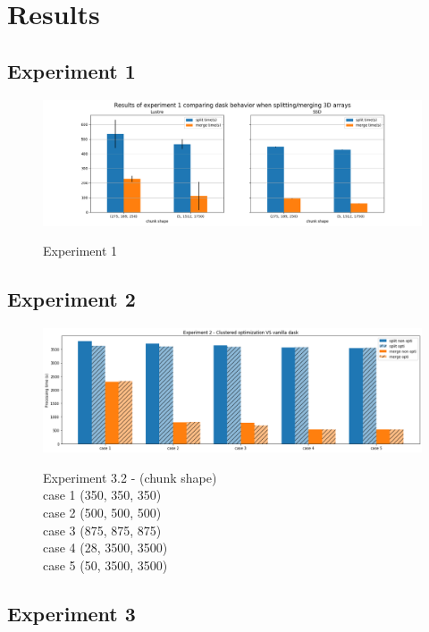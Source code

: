 \documentclass[conference]{IEEEtran}
\begin{document}
\section{Results}

\subsection{Experiment 1}
\begin{figure}
  \centering
  \includegraphics[scale=0.5]{./figures/exp1_results.png}
  \label{fig:exp1}
  \caption{Experiment 1}
\end{figure}

\subsection{Experiment 2}
\begin{figure}
  \centering
  \includegraphics[scale=0.5]{./figures/exp2_results.png}
  \label{fig:exp2}
  \caption{Experiment 3.2  - (chunk shape)\\
  case 1 (350, 350, 350)\\
  case 2 (500, 500, 500)\\
  case 3 (875, 875, 875)\\
  case 4 (28, 3500, 3500)\\
  case 5 (50, 3500, 3500)\\
  }
\end{figure}

\subsection{Experiment 3}
\end{document}
